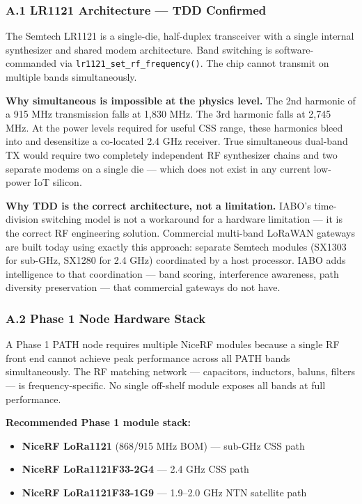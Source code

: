 \documentclass[
  11pt,
]{article}
\providecommand{\tightlist}{%
  \setlength{\itemsep}{0pt}\setlength{\parskip}{0pt}}
\begin{document}
\hypertarget{a.1-lr1121-architecture-tdd-confirmed}{%
\subsubsection{A.1 LR1121 Architecture --- TDD
Confirmed}\label{a.1-lr1121-architecture-tdd-confirmed}}

The Semtech LR1121 is a single-die, half-duplex transceiver with a
single internal synthesizer and shared modem architecture. Band
switching is software-commanded via
\texttt{lr1121\_set\_rf\_frequency()}. The chip cannot transmit on
multiple bands simultaneously.

\textbf{Why simultaneous is impossible at the physics level.} The 2nd
harmonic of a 915 MHz transmission falls at 1,830 MHz. The 3rd harmonic
falls at 2,745 MHz. At the power levels required for useful CSS range,
these harmonics bleed into and desensitize a co-located 2.4 GHz
receiver. True simultaneous dual-band TX would require two completely
independent RF synthesizer chains and two separate modems on a single
die --- which does not exist in any current low-power IoT silicon.

\textbf{Why TDD is the correct architecture, not a limitation.} IABO's
time-division switching model is not a workaround for a hardware
limitation --- it is the correct RF engineering solution. Commercial
multi-band LoRaWAN gateways are built today using exactly this approach:
separate Semtech modules (SX1303 for sub-GHz, SX1280 for 2.4 GHz)
coordinated by a host processor. IABO adds intelligence to that
coordination --- band scoring, interference awareness, path diversity
preservation --- that commercial gateways do not have.

\hypertarget{a.2-phase-1-node-hardware-stack}{%
\subsubsection{A.2 Phase 1 Node Hardware
Stack}\label{a.2-phase-1-node-hardware-stack}}

A Phase 1 PATH node requires multiple NiceRF modules because a single RF
front end cannot achieve peak performance across all PATH bands
simultaneously. The RF matching network --- capacitors, inductors,
baluns, filters --- is frequency-specific. No single off-shelf module
exposes all bands at full performance.

\textbf{Recommended Phase 1 module stack:}

\begin{itemize}
\tightlist
\item
  \textbf{NiceRF LoRa1121} (868/915 MHz BOM) --- sub-GHz CSS path
\item
  \textbf{NiceRF LoRa1121F33-2G4} --- 2.4 GHz CSS path
\item
  \textbf{NiceRF LoRa1121F33-1G9} --- 1.9--2.0 GHz NTN satellite path
\end{itemize}
\end{document}
